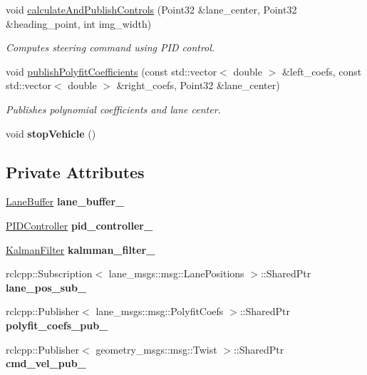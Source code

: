 \begin{DoxyCompactItemize}
void \hyperlink{classMotionControlNode_abad42e896700d175ae870d3eed4a79ea}{calculate\+And\+Publish\+Controls} (Point32 \&lane\+\_\+center, Point32 \&heading\+\_\+point, int img\+\_\+width)
\begin{DoxyCompactList}\small\item\em Computes steering command using P\+ID control. \end{DoxyCompactList}\item 
void \hyperlink{classMotionControlNode_a2f890913a81fdb965348897dbd972a77}{publish\+Polyfit\+Coefficients} (const std\+::vector$<$ double $>$ \&left\+\_\+coefs, const std\+::vector$<$ double $>$ \&right\+\_\+coefs, Point32 \&lane\+\_\+center)
\begin{DoxyCompactList}\small\item\em Publishes polynomial coefficients and lane center. \end{DoxyCompactList}\item 
\mbox{\label{classMotionControlNode_a9ab1d5f6c9141de3c04ce19bc29e14a6}} 
void {\bfseries stop\+Vehicle} ()
\end{DoxyCompactItemize}
\subsection*{Private Attributes}
\begin{DoxyCompactItemize}
\item 
\mbox{\label{classMotionControlNode_ab153e88844739c39e94bf0ba8540251e}} 
\hyperlink{classLaneBuffer}{Lane\+Buffer} {\bfseries lane\+\_\+buffer\+\_\+}
\item 
\mbox{\label{classMotionControlNode_a9848ef14a93e7123e9ce374b422d7952}} 
\hyperlink{classPIDController}{P\+I\+D\+Controller} {\bfseries pid\+\_\+controller\+\_\+}
\item 
\mbox{\label{classMotionControlNode_a62db65bd876573bdd43ffe25bfb6e7c5}} 
\hyperlink{classKalmanFilter}{Kalman\+Filter} {\bfseries kalmman\+\_\+filter\+\_\+}
\item 
\mbox{\label{classMotionControlNode_a6fa75a61f3fe7005de566cd309ae9c89}} 
rclcpp\+::\+Subscription$<$ lane\+\_\+msgs\+::msg\+::\+Lane\+Positions $>$\+::Shared\+Ptr {\bfseries lane\+\_\+pos\+\_\+sub\+\_\+}
\item 
\mbox{\label{classMotionControlNode_adc9d49fff416c5cb0876d0faca92b081}} 
rclcpp\+::\+Publisher$<$ lane\+\_\+msgs\+::msg\+::\+Polyfit\+Coefs $>$\+::Shared\+Ptr {\bfseries polyfit\+\_\+coefs\+\_\+pub\+\_\+}
\item 
\mbox{\label{classMotionControlNode_a372b6363a6aaa816636bb3dc9e371eb1}} 
rclcpp\+::\+Publisher$<$ geometry\+\_\+msgs\+::msg\+::\+Twist $>$\+::Shared\+Ptr {\bfseries cmd\+\_\+vel\+\_\+pub\+\_\+}
\end{DoxyCompactItemize}


